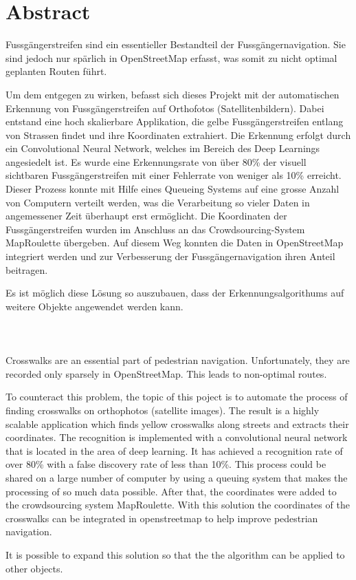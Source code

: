 \section{Abstract}

Fussgängerstreifen sind ein essentieller Bestandteil der Fussgängernavigation. Sie sind jedoch nur spärlich in OpenStreetMap erfasst, was somit zu nicht optimal geplanten Routen führt.

Um dem entgegen zu wirken,  befasst sich dieses Projekt mit der automatischen Erkennung von Fussgängerstreifen auf Orthofotos (Satellitenbildern). 
Dabei entstand eine hoch skalierbare Applikation, die gelbe Fussgängerstreifen entlang von Strassen findet und ihre Koordinaten extrahiert. Die Erkennung erfolgt durch ein Convolutional Neural Network, welches im Bereich des Deep Learnings angesiedelt ist.
Es wurde eine Erkennungsrate von über 80\% der visuell sichtbaren Fussgängerstreifen mit einer Fehlerrate von weniger als 10\% erreicht. Dieser Prozess konnte mit Hilfe eines Queueing Systems auf eine grosse Anzahl von Computern verteilt werden, was die Verarbeitung so vieler Daten in angemessener Zeit überhaupt erst ermöglicht. Die Koordinaten der Fussgängerstreifen wurden im Anschluss an das Crowdsourcing-System MapRoulette übergeben. Auf diesem Weg konnten die Daten in OpenStreetMap integriert werden und zur Verbesserung der Fussgängernavigation ihren Anteil beitragen.

Es ist möglich diese Lösung so auszubauen, dass der Erkennungsalgorithums auf weitere Objekte angewendet werden kann.\\ \\ \\ \\




Crosswalks are an essential part of pedestrian navigation. Unfortunately, they are recorded only sparsely in OpenStreetMap. This leads to non-optimal routes.

To counteract this problem, the topic of this poject is to automate the process of finding crosswalks on orthophotos (satellite images). The result is a highly scalable application which finds yellow crosswalks along streets and extracts their coordinates. The recognition is implemented with a convolutional neural network that is located in the area of deep learning. It has achieved a recognition rate of over 80\% with a false discovery rate of less than 10\%. This process could be shared on a large number of computer by using a queuing system that makes the processing of so much data possible. After that, the coordinates were added to the crowdsourcing system MapRoulette. With this solution the coordinates of the crosswalks can be integrated in openstreetmap to help improve pedestrian navigation.

It is possible to expand this solution so that the the algorithm can be applied to other objects.

